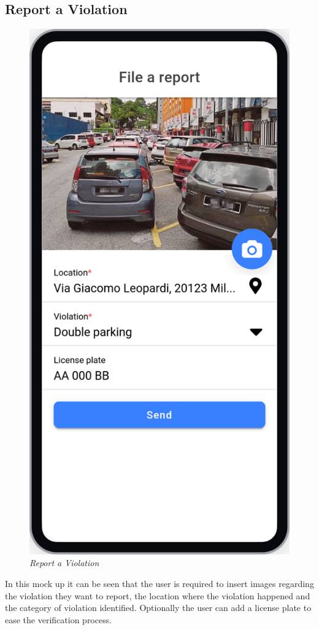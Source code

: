\subsection{Report a Violation}
\begin{figure}[H]
  \centering
  \includegraphics[origin=c,width=\textwidth,height=.90\textheight,keepaspectratio]{DD_Images/UserInterface/Report.jpg}
  \caption{\textit{Report a Violation}}
\end{figure}

In this mock up it can be seen that the user is required to insert images regarding the violation they want to report,
the location where the violation happened and the category of violation identified.
Optionally the user can add a license plate to ease the verification process.